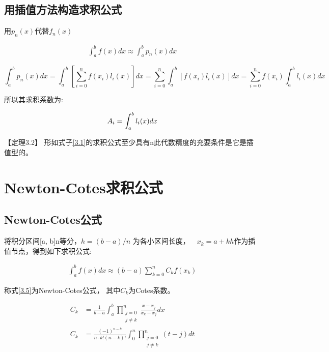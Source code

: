 \documentclass[12pt]{report}
\begin{document}
\subsection{用插值方法构造求积公式}

用$p_n(x)$代替$f_n(x)$

\begin{equation}
	\begin{aligned}
		\int_{a}^{b} f(x) dx \approx \int_{a}^{b} p_n(x) dx
	\end{aligned}
	\tag{3.4} \label{3.4}
\end{equation}

\[
	\int_{a}^{b} p_n(x) dx = \int_{a}^{b} \left[\sum_{i=0}^{n} f\left(x_i\right)l_i\left(x\right) \right] dx = \sum_{i=0}^{n} \int_{a}^{b}\left[f\left(x_i \right) l_i \left(x\right)\right]dx = \sum_{i=0}^{n}f(x_i)\int_{a}^{b}l_i(x)dx
\]

所以其求积系数为:

\begin{equation}
	\begin{aligned}
		A_i = \int_{a}^{b} l_i(x) dx
	\end{aligned}
	\notag
\end{equation} 

【定理3.2】 \quad 形如式子\eqref{3.1}的求积公式至少具有n此代数精度的充要条件是它是插值型的。


\section{Newton-Cotes求积公式}

\subsection{Newton-Cotes公式}

将积分区间[a, b]n等分，$h=(b - a)/n$ 为各小区间长度，$\quad x_k = a + kh$作为插值节点，得到如下求积公式:

\begin{equation}
	\begin{aligned}
		\int_{a}^{b} f(x) dx \approx (b - a) \sum_{k=0}^n C_k f(x_k)
	\end{aligned}
	\tag{3.5} \label{3.5}
\end{equation} 

称式\eqref{3.5}为Newton-Cotes公式， 其中$C_k$为Cotes系数。

\begin{equation} \tag{3.6} \label{3.6}
	\begin{aligned}
		C_k &= \frac{1}{b-a} \int_{a}^{b} \prod_{\substack{j = 0 \\ j \neq k}}^{n} \frac{x - x_j}{x_k - x_j}dx  \\
		C_k &= \frac{(-1)^{n-k}}{n \cdot k! (n - k)!}\int_{0}^{n} \prod_{\substack{j=0 \\ j \neq k}}^{n} (t-j) dt
	\end{aligned}
\end{equation}
\end{document}
